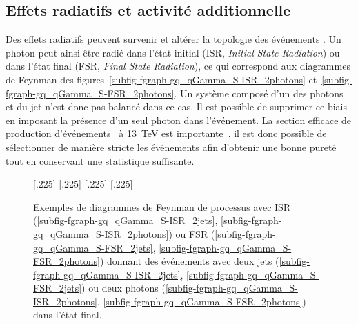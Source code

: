 \subsection{Effets radiatifs et activité additionnelle}
Des effets radiatifs peuvent survenir et altérer la topologie des événements \Gjet.
Un photon peut ainsi être radié dans l'état initial (ISR, \emph{Initial State Radiation}) ou dans l'état final (FSR, \emph{Final State Radiation}), ce qui correspond aux diagrammes de Feynman des figures~\ref{subfig-fgraph-gq_qGamma_S-ISR_2photons} et~\ref{subfig-fgraph-gq_qGamma_S-FSR_2photons}.
Un système composé d'un des photons et du jet n'est donc pas balancé dans ce cas.
Il est possible de supprimer ce biais en imposant la présence d'un seul photon dans l'événement.
La section efficace de production d'événements \Gjet\ à \SI{13}{\TeV} est importante~\cite{Gjet_xsec_2018}, il est donc possible de sélectionner de manière stricte les événements afin d'obtenir une bonne pureté tout en conservant une statistique suffisante.
\begin{figure}[h]
\centering\vspace{\baselineskip}
\subcaptionbox{\label{subfig-fgraph-gq_qGamma_S-ISR_2jets}}[.225\textwidth]
{\vspace{\baselineskip}}
\hfill
\subcaptionbox{\label{subfig-fgraph-gq_qGamma_S-ISR_2photons}}[.225\textwidth]
{\vspace{\baselineskip}}
\hfill
\subcaptionbox{\label{subfig-fgraph-gq_qGamma_S-FSR_2jets}}[.225\textwidth]
{\vspace{\baselineskip}}
\hfill
\subcaptionbox{\label{subfig-fgraph-gq_qGamma_S-FSR_2photons}}[.225\textwidth]
{\vspace{\baselineskip}}
\caption[Diagrammes de Feynman de processus avec ISR ou FSR.]{Exemples de diagrammes de Feynman de processus avec ISR (\ref{subfig-fgraph-gq_qGamma_S-ISR_2jets}, \ref{subfig-fgraph-gq_qGamma_S-ISR_2photons}) ou FSR (\ref{subfig-fgraph-gq_qGamma_S-FSR_2jets}, \ref{subfig-fgraph-gq_qGamma_S-FSR_2photons}) donnant des événements avec deux jets (\ref{subfig-fgraph-gq_qGamma_S-ISR_2jets}, \ref{subfig-fgraph-gq_qGamma_S-FSR_2jets}) ou deux photons (\ref{subfig-fgraph-gq_qGamma_S-ISR_2photons}, \ref{subfig-fgraph-gq_qGamma_S-FSR_2photons}) dans l'état final.}
\label{fig-fgraph-gamma_plus_jets-ISR-FSR}
\end{figure}

